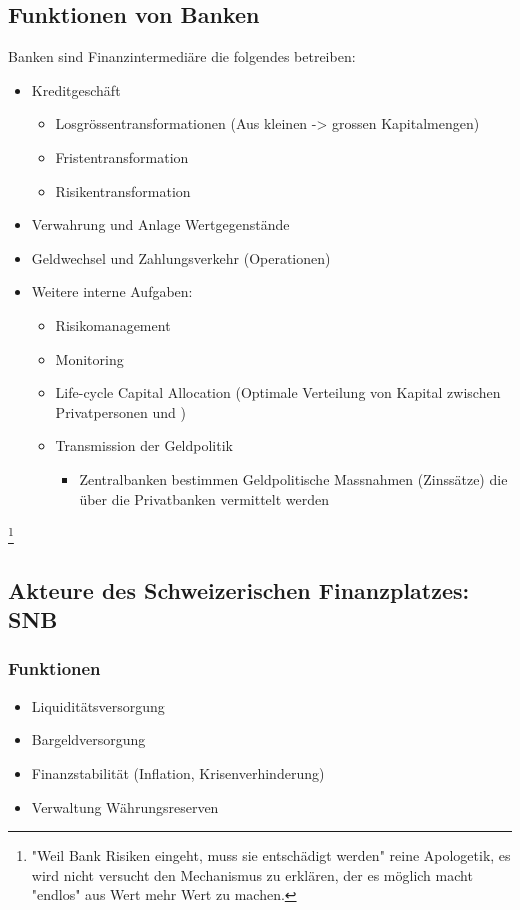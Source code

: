 \subsection{Funktionen von Banken}
Banken sind Finanzintermediäre die folgendes betreiben:
\begin{itemize}
    \item Kreditgeschäft
    \begin{itemize}
        \item Losgrössentransformationen (Aus kleinen -> grossen Kapitalmengen)
        \item Fristentransformation 
        \item Risikentransformation 
    \end{itemize}
    \item Verwahrung und Anlage Wertgegenstände
    \item Geldwechsel und Zahlungsverkehr (Operationen)
    \item Weitere interne Aufgaben:
    \begin{itemize}
        \item Risikomanagement 
        \item Monitoring
        \item Life-cycle Capital Allocation (Optimale Verteilung von Kapital zwischen Privatpersonen und )
        \item Transmission der Geldpolitik
        \begin{itemize}
            \item Zentralbanken bestimmen Geldpolitische Massnahmen (Zinssätze) die über die Privatbanken vermittelt werden 
        \end{itemize}
    \end{itemize}
\end{itemize} 
\footnote{"Weil Bank Risiken eingeht, muss sie entschädigt werden" reine Apologetik, es wird nicht versucht den Mechanismus zu erklären, der es möglich macht "endlos" aus Wert mehr Wert zu machen.}

\subsection{Akteure des Schweizerischen Finanzplatzes: SNB}

\subsubsection{Funktionen}
\begin{itemize}
    \item Liquiditätsversorgung
    \item Bargeldversorgung
\item Finanzstabilität (Inflation, Krisenverhinderung)
\item Verwaltung Währungsreserven
\end{itemize}
